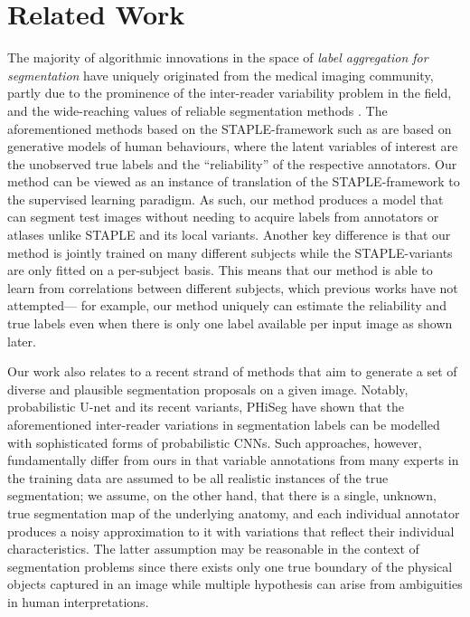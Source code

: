 \section{Related Work}
The majority of algorithmic innovations in the space of \textit{label aggregation for segmentation} have uniquely originated from the medical imaging community, partly due to the prominence of the inter-reader variability problem in the field, and the wide-reaching values of reliable segmentation methods \cite{asman2012formulating}. The aforementioned methods based on the STAPLE-framework such as \cite{warfield2004simultaneous,asman2011robust,asman2012formulating,cardoso2013steps,weisenfeld2011learning,asman2013non,asman2013non,akhondi2014logarithmic,joskowicz2018automatic} are based on generative models of human behaviours, where the latent variables of interest are the unobserved true labels and the ``reliability'' of the respective annotators. Our method can be viewed as an instance of translation of the STAPLE-framework to the supervised learning paradigm. As such, our method produces a model that can segment test images without needing to acquire labels from annotators or atlases unlike STAPLE and its local variants. Another key difference is that our method is jointly trained on many different subjects while the STAPLE-variants are only fitted on a per-subject basis. This means that our method is able to learn from correlations between different subjects, which previous works have not attempted--- for example, our method uniquely can estimate the reliability and true labels even when there is only one label available per input image as shown later. 

Our work also relates to a recent strand of methods that aim to generate a set of diverse and plausible segmentation proposals on a given image. Notably, probabilistic U-net \cite{kohl2018probabilistic} and its recent variants, PHiSeg \cite{baumgartner2019phiseg} have shown that the aforementioned inter-reader variations in segmentation labels can be modelled with sophisticated forms of probabilistic CNNs. Such approaches, however, fundamentally differ from ours in that variable annotations from many experts in the training data are assumed to be all realistic instances of the true segmentation; we assume, on the other hand, that there is a single, unknown, true segmentation map of the underlying anatomy, and each individual annotator produces a noisy approximation to it with variations that reflect their individual characteristics. The latter assumption may be reasonable in the context of segmentation problems since there exists only one true boundary of the physical objects captured in an image while multiple hypothesis can arise from ambiguities in human interpretations.

